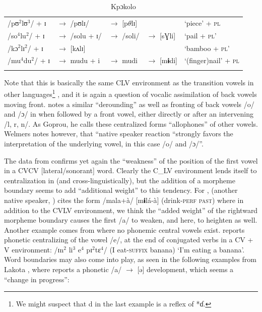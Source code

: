\documentclass[output=paper
,newtxmath
,modfonts
,nonflat]{langsci/langscibook}
\begin{document}
\begin{table}
\label{tab:zogbo:22}
\caption{Kpɔkolo \citep[202-206]{Goprou2014}}                                  
\begin{tabular}{lllll}
\lsptoprule
/pʊ$^2$lʊ$^3$/ + ɪ 
& $\rightarrow$ /pʊlɪ/  
& $\rightarrow$ [p$\theta $lɪ]        
&
& ‘piece’ + \textsc{pl}   \\

/so$^4$lu$^2$/ + ɪ  
& $\rightarrow$ /solu + ɪ/ 
& $\rightarrow$ /soli/  
& $\rightarrow$ [sƔli]   
& ‘pail + \textsc{pl}’  \\

/kɔ$^2$lɪ$^2$/ + ɪ 
& $\rightarrow$ [kʌlɪ]     
& 
&     
& ‘bamboo + \textsc{pl}’   \\

/mu$^4$du$^2$/ + ɪ  
& $\rightarrow$ mudu + i  
& $\rightarrow$ mudi 
& $\rightarrow$ [m\textbf{ɨ}di]   
& ‘(finger)nail’ + \textsc{pl}\\
\lspbottomrule
\end{tabular}	
\end{table}

Note that this is basically the same CLV environment as the transition vowels in other languages\footnote{We might suspect that d in the last example is a reflex of *ɗ.} , and it is again a question of vocalic assimilation of back vowels moving front. \citet{Welmers1973} notes a similar “derounding” as well as fronting of back vowels /o/ and /ɔ/ in  when followed by a front vowel, either directly or after an intervening /l, r, n/. As Goprou, he calls these centralized forms “allophones” of other vowels. Welmers notes however, that “native speaker reaction “strongly favors the interpretation of the underlying vowel, in this case /o/ and /ɔ/”. 

The data from  confirms yet again the “weakness” of the position of the first vowel in a CVCV [lateral/sonorant] word. Clearly the C\_LV environment lends itself to centralization in  (and cross-linguistically), but the addition of a morpheme boundary seems to add “additional weight” to this tendency. For , \citeauthor{Kokora1976} (another native speaker, \citeyear[39]{Kokora1976}) cites the form /mala+à/ [m\textbf{ɨ}lá-à] (drink-\textsc{perf} \textsc{past}) where in addition to the CVLV environment, we think the “added weight” of the rightward morpheme boundary causes the first /a/ to weaken, and here, to heighten as well. Another example comes from { where no phonemic central vowels exist.} \citet[50]{Bentinck1978} reports phonetic centralizing of the vowel /e/, at the end of conjugated verbs in a CV + V environment:  /ɪn$^2$  li$^3$ e$^4$ pɪ$^2$tɛ$^4$/ (I eat-\textsc{suffix} banana) ‘I’m eating a banana’.  Word boundaries may also come into play, as seen in the following examples from Lakota , where \citet[47]{Guehoun1993} reports a phonetic /a/ $\rightarrow$ [ə] development, which seems a “change in progress”: 
\end{document}
